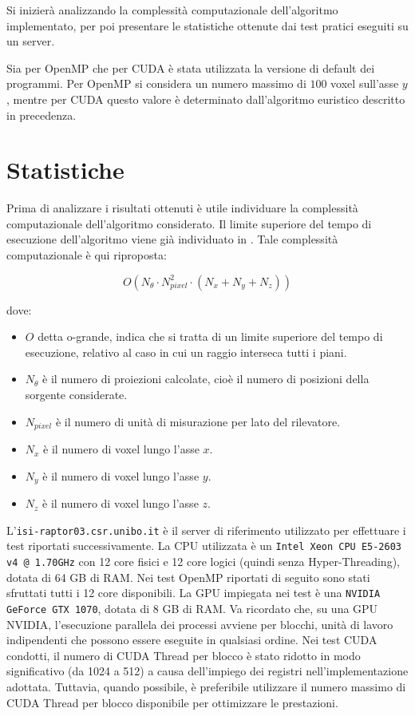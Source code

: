 \documentclass[12pt,a4paper]{report}
\begin{document}
Si inizierà analizzando la complessità computazionale dell'algoritmo implementato, per poi presentare le statistiche ottenute dai
test pratici eseguiti su un server.

Sia per OpenMP che per CUDA è stata utilizzata la versione di default dei programmi.
Per OpenMP si considera un numero massimo di \(100\) voxel sull'asse \(y\), mentre per CUDA questo valore è determinato
dall'algoritmo euristico descritto in precedenza.

\section{Statistiche}

Prima di analizzare i risultati ottenuti è utile individuare la complessità computazionale dell'algoritmo considerato.
Il limite superiore del tempo di esecuzione dell'algoritmo viene già individuato in \cite{Colletta2024}.
Tale complessità computazionale è qui riproposta:

\begin{equation} \label{eq:computational_complexity}
  O(N_\theta \cdot N_{pixel}^2 \cdot (N_x + N_y + N_z))
\end{equation}

dove:
\begin{itemize}
  \item \(O\) detta o-grande, indica che si tratta di un limite superiore del tempo di esecuzione, relativo al caso in cui un
        raggio interseca tutti i piani.
  \item \(N_\theta\) è il numero di proiezioni calcolate, cioè il numero di posizioni della sorgente considerate.
  \item \(N_{pixel}\) è il numero di unità di misurazione per lato del rilevatore.
  \item \(N_x\) è il numero di voxel lungo l'asse \(x\).
  \item \(N_y\) è il numero di voxel lungo l'asse \(y\).
  \item \(N_z\) è il numero di voxel lungo l'asse \(z\).
\end{itemize}

L'\mbox{\lstinline{isi-raptor03.csr.unibo.it}} è il server di riferimento utilizzato per effettuare i test riportati
successivamente.
La CPU utilizzata è un \lstinline{Intel Xeon CPU E5-2603 v4 @ 1.70GHz} con 12 core fisici e 12 core logici (quindi senza
Hyper-Threading), dotata di 64 GB di RAM.
Nei test OpenMP riportati di seguito sono stati sfruttati tutti i 12 core disponibili.
La GPU impiegata nei test è una \mbox{\lstinline{NVIDIA GeForce GTX 1070},} dotata di 8 GB di RAM.
Va ricordato che, su una GPU NVIDIA, l'esecuzione parallela dei processi avviene per blocchi, unità di lavoro indipendenti che
possono essere eseguite in qualsiasi ordine.
Nei test CUDA condotti, il numero di CUDA Thread per blocco è stato ridotto in modo significativo (da 1024 a 512) a causa
dell'impiego dei registri nell'implementazione adottata.
Tuttavia, quando possibile, è preferibile utilizzare il numero massimo di CUDA Thread per blocco disponibile per ottimizzare le
prestazioni.
\end{document}
